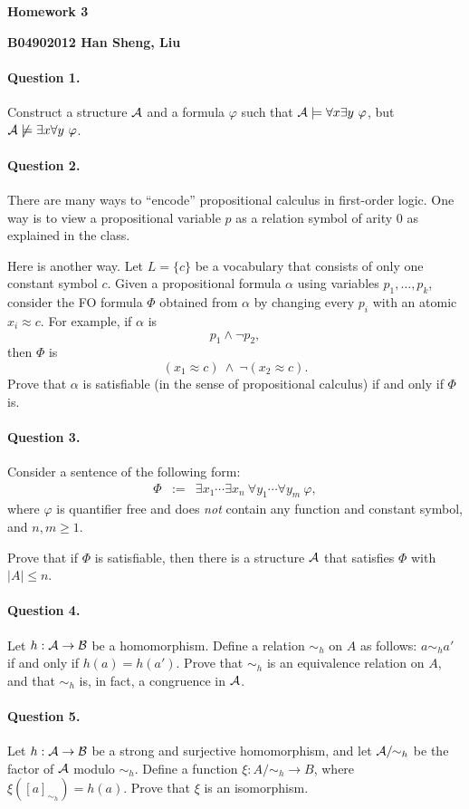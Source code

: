 \documentclass[11pt, a4paper]{article}
\renewcommand{\fulltitle}{Homework 3}
\begin{document}
\date{}




\begin{center}
{\Large {\bf \fulltitle}}
\end{center}
\hfill{\bf B04902012 Han Sheng, Liu}
\vspace{0.7cm}


\paragraph*{Question 1.}
Construct a structure $\mathcal{A}$ and a formula $\varphi$ such that
$\cA \models \forall x \exists y \ \varphi$,
but $\mathcal{A} \not\models \exists x \forall y \ \varphi$.



\paragraph*{Question 2.}
There are many ways to ``encode''
propositional calculus in first-order logic.
One way is to view a propositional variable $p$ as
a relation symbol of arity $0$
as explained in the class.

Here is another way.
Let $L = \{c\}$ be a vocabulary that consists of only one
constant symbol $c$.
Given a propositional formula $\alpha$ 
using variables $p_1,\ldots,p_k$,
consider the FO formula $\Phi$
obtained from $\alpha$ by 
changing every $p_i$ with an atomic $x_i \approx c$.
For example, if $\alpha$ is 
$$p_1\wedge \neg p_2,$$
then $\Phi$ is 
$$
(x_1 \approx c) \ \wedge \ \neg (x_2 \approx c).
$$
Prove that
$\alpha$ is satisfiable (in the sense of propositional calculus)
if and only if $\Phi$ is.


\paragraph*{Question 3.}
Consider a sentence of the following form:
\begin{eqnarray*}
\Phi & := & \exists x_1 \cdots \exists x_n \ \forall y_1 \cdots \forall y_m \ \varphi,
\end{eqnarray*}
where $\varphi$ is quantifier free and does {\em not} contain any function and constant symbol, and $n,m \geq 1$.

Prove that if $\Phi$ is satisfiable, then there is a structure $\mathcal{A}$ that satisfies $\Phi$ with $|A|\leq n$. 


\paragraph*{Question 4.}
Let $h:\mathcal{A} \to \mathcal{B}$ be a homomorphism.
Define a relation $\sim_h$ on $A$ as follows:
$a \sim_h a'$ if and only if $h(a)=h(a')$.
Prove that $\sim_h$ is an equivalence relation on $A$,
and that $\sim_h$ is, in fact, a congruence in $\mathcal{A}$.

\paragraph*{Question 5.}
Let $h:\mathcal{A}\to\mathcal{B}$ be a strong and surjective homomorphism,
and let $\mathcal{A}/\!\!\sim_h$ be the factor of $\mathcal{A}$ modulo $\sim_h$.
Define a function $\xi:A/\!\!\sim_h \to B$,
where $\xi([a]_{\sim_h}) = h(a)$.
Prove that $\xi$ is an isomorphism.
\end{document}
